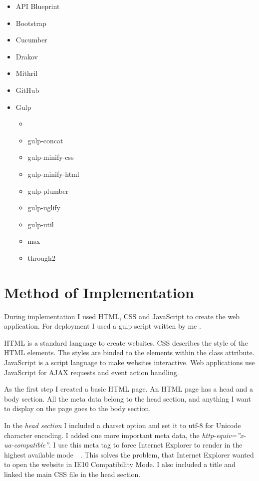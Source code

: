 
\begin{itemize}
	\item API Blueprint
	\item Bootstrap
	\item Cucumber	
	\item Drakov
	\item Mithril
	\item GitHub
	\item Gulp
	\begin{itemize}
    \item {}
		\item gulp-concat
		\item gulp-minify-css
		\item gulp-minify-html
		\item gulp-plumber		
		\item gulp-uglify
		\item gulp-util
		\item msx
		\item through2
	\end{itemize}
\end{itemize}


\section{Method of Implementation}
During implementation I used HTML, CSS and JavaScript to create the web application. For deployment I used a gulp script written by me . 

HTML is a standard language to create websites. CSS describes the style of the HTML elements. The styles are binded to the elements within the class attribute. JavaScript is a script language to make websites interactive. Web applications use JavaScript for AJAX requests and event action handling. 

As the first step I created a basic HTML page. An HTML page has a head and a body section. All the meta data belong to the head section, and anything I want to display on the page goes to the body section. \label{html-impl}

In the \emph{head section} I included a charset option and set it to utf-8 for Unicode character encoding. I added one more important meta data, the \emph{http-equiv=''x-ua-compatible''}. I use this meta tag to force Internet Explorer to render in the highest available mode~\cite{IE10-microsoft}~\cite{IE10-html5-boiler}. This solves the problem, that Internet Explorer wanted to open the website in IE10 Compatibility Mode. I also included a title and linked the main CSS file in the head section.

